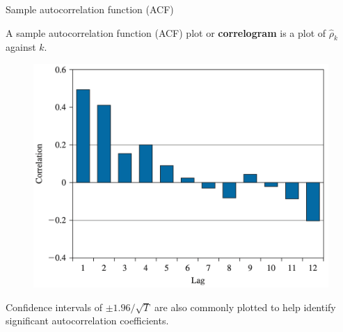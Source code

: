 \documentclass[10pt,aspectratio=169]{beamer}  %
\begin{document}

\begin{frame}{Sample autocorrelation function (ACF)}

    \bigskip

    A sample autocorrelation function (ACF) plot or \textbf{correlogram} is a plot of $ \widehat{\rho}_{k} $ against $ k $.

    \vspace{-0.3cm}
    \begin{figure}[H]
        \centering
        \includegraphics[height=0.35\textwidth]{./fig/correlogram.png}
    \end{figure}
    \vspace{-0.4cm}

    Confidence intervals of $ \pm 1.96/\sqrt{T} $ are also commonly plotted to help identify significant autocorrelation coefficients.

\end{frame}



%     
%     


\end{document}
